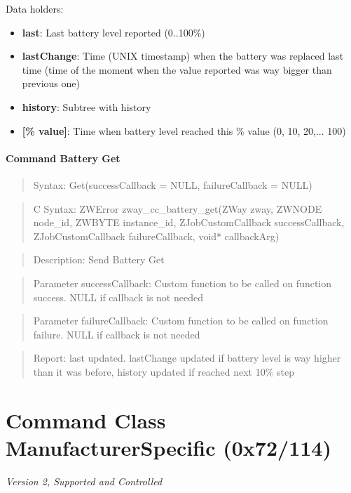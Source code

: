 \noindent
Data holders:

\begin{itemize}
\item \textbf{last}: Last battery level reported (0..100\%)
\item \textbf{lastChange}: Time (UNIX timestamp) when the battery was replaced last time (time of the moment when the value reported was way bigger than previous one)
\item \textbf{history}: Subtree with history
\item \qquad\textbf{[\% value]}: Time when battery level reached this \% value (0, 10, 20,... 100)
\end{itemize}

\paragraph{Command Battery Get}
\begin{quote}Syntax: Get(successCallback = NULL, failureCallback = NULL)\end{quote}
\begin{quote}C Syntax: ZWError zway\_cc\_battery\_get(ZWay zway, ZWNODE node\_id, ZWBYTE instance\_id, ZJobCustomCallback successCallback, ZJobCustomCallback failureCallback, void* callbackArg)\end{quote}
\begin{quote}Description: Send Battery Get\end{quote}
\begin{quote}Parameter successCallback: Custom function to be called on function success. NULL if callback is not needed\end{quote}
\begin{quote}Parameter failureCallback: Custom function to be called on function failure. NULL if callback is not needed\end{quote}
\begin{quote}Report: last updated. lastChange updated if battery level is way higher than it was before, history updated if reached next 10\% step\end{quote}


\section{Command Class ManufacturerSpecific (0x72/114)}

\textit{Version 2, Supported and Controlled}
\newline

